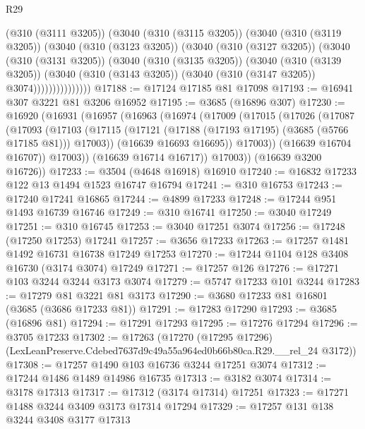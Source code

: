 \begin{lexlean}{R29}
\begin{coremodule}
                (@310 (@3111 @3205))
                (@3040
                  (@310 (@3115 @3205))
                  (@3040
                    (@310 (@3119 @3205))
                    (@3040
                      (@310 (@3123 @3205))
                      (@3040
                        (@310 (@3127 @3205))
                        (@3040
                          (@310 (@3131 @3205))
                          (@3040
                            (@310 (@3135 @3205))
                            (@3040
                              (@310 (@3139 @3205))
                              (@3040
                                (@310 (@3143 @3205))
                                (@3040 (@310 (@3147 @3205)) @3074)))))))))))))))
@17188 := @17124 @17185 @81 @17098
@17193 := @16941 @307 @3221 @81 @3206 @16952
@17195 := @3685 (@16896 @307)
@17230 := @16920
    (@16931
      (@16957
        (@16963
          (@16974
            (@17009
              (@17015
                (@17026
                  (@17087
                    (@17093
                      (@17103
                        (@17115 (@17121 (@17188 (@17193 @17195) (@3685 (@5766 @17185 @81))) @17003))
                        (@16639 @16693 @16695))
                      @17003))
                  (@16639 @16704 @16707))
                @17003))
            (@16639 @16714 @16717))
          @17003))
      (@16639 @3200 @16726))
@17233 := @3504 (@4648 @16918) @16910
@17240 := @16832 @17233 @122 @13 @1494 @1523 @16747 @16794
@17241 := @310 @16753
@17243 := @17240 @17241 @16865
@17244 := @4899 @17233
@17248 := @17244 @951 @1493 @16739 @16746
@17249 := @310 @16741
@17250 := @3040 @17249
@17251 := @310 @16745
@17253 := @3040 @17251 @3074
@17256 := @17248 (@17250 @17253) @17241
@17257 := @3656 @17233
@17263 := @17257 @1481 @1492 @16731 @16738 @17249 @17253
@17270 := @17244 @1104 @128 @3408 @16730 (@3174 @3074) @17249
@17271 := @17257 @126
@17276 := @17271 @103 @3244 @3244 @3173 @3074
@17279 := @5747 @17233 @101 @3244
@17283 := @17279 @81 @3221 @81 @3173
@17290 := @3680 @17233 @81 @16801 (@3685 (@3686 @17233 @81))
@17291 := @17283 @17290
@17293 := @3685 (@16896 @81)
@17294 := @17291 @17293
@17295 := @17276 @17294
@17296 := @3705 @17233
@17302 := @17263
    (@17270 (@17295 @17296) (LexLeanPreserve.Cdebed7637d9c49a55a964ed0b66b80ca.R29.__rel_24 @3172))
@17308 := @17257 @1490 @103 @16736 @3244 @17251 @3074
@17312 := @17244 @1486 @1489 @14986 @16735
@17313 := @3182 @3074
@17314 := @3178 @17313
@17317 := @17312 (@3174 @17314) @17251
@17323 := @17271 @1488 @3244 @3409 @3173 @17314 @17294
@17329 := @17257 @131 @138 @3244 @3408 @3177 @17313

\end{coremodule}
\end{lexlean}
